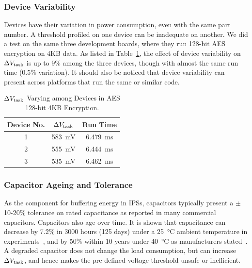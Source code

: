 \subsubsection{Device Variability}

Devices have their variation in power consumption, even with the same part number. 
A threshold profiled on one device can be inadequate on another. 
We did a test on the same three development boards, where they run 128-bit AES encryption on 4KB data. 
As listed in Table~\ref{tab:device}, the effect of device variability on $\Delta V_{\text{task}}$ is up to 9\% among the three devices, though with almost the same run time (0.5\% variation). 
It should also be noticed that device variability can present across platforms that run the same or similar code. 

\begin{table}
    \renewcommand{\arraystretch}{1.2}
    \centering
    \begin{tabular}{|c|c|c|}
    \hline
    \textbf{Device No.} & \textbf{$\Delta V_{\text{task}}$} & \textbf{Run Time} \\
    \hline
    1 & \SI{583}{\milli\volt} & \SI{6.479}{\milli\second} \\
    2 & \SI{555}{\milli\volt} & \SI{6.444}{\milli\second} \\
    3 & \SI{535}{\milli\volt} & \SI{6.462}{\milli\second} \\
    \hline
    \end{tabular}
    \caption{$\Delta V_{\text{task}}$ Varying among Devices in AES 128-bit 4KB Encryption.}
    \label{tab:device}
\end{table}

\subsubsection{Capacitor Ageing and Tolerance}
\label{subsubsec:capacitance_variability}

As the component for buffering energy in IPSs, capacitors typically present a $\pm$10-20\% tolerance on rated capacitance as reported in many commercial capacitors. 
Capacitors also age over time. 
It is shown that capacitance can decrease by 7.2\% in 3000 hours (125 days) under a \SI{25}{\celsius} ambient temperature in experiments~\cite{kulkarni2010experimental}, and by 50\% within 10 years under \SI{40}{\celsius} as manufacturers stated~\cite{vishaycapacitor}.
A degraded capacitor does not change the load consumption, but can increase $\Delta V_{\text{task}}$, and hence makes the pre-defined voltage threshold unsafe or inefficient. 


